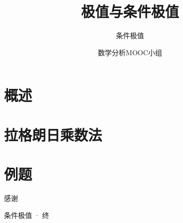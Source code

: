 \documentclass[xetex]{beamer}
\title{极值与条件极值}
\subtitle{条件极值}
\author{数学分析MOOC小组}
\date{}
\begin{document}
    \frame{\maketitle}

    \section{概述}
    
    \section{拉格朗日乘数法}
    
    \section{例题}
    
    

    \begin{frame}[standout]

        感谢

        \small{条件极值 · 终}
    
    \end{frame}
\end{document}
